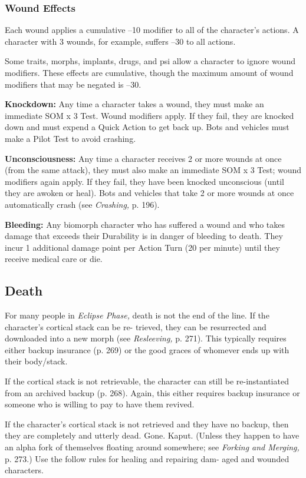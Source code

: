 \subsubsection{Wound Effects}

Each wound applies a cumulative –10 modifier to all 
of the character's actions. A character with 3 wounds, 
for example, suffers –30 to all actions.

Some traits, morphs, implants, drugs, and psi allow 
a character to ignore wound modifiers. These effects 
are cumulative, though the maximum amount of 
wound modifiers that may be negated is –30.

\textbf{Knockdown:} Any time a character takes a wound, 
they must make an immediate SOM x 3 Test. Wound 
modifiers apply. If they fail, they are knocked down 
and must expend a Quick Action to get back up. Bots 
and vehicles must make a Pilot Test to avoid crashing.

\textbf{Unconsciousness:} Any time a character receives 2 
or more wounds at once (from the same attack), they 
must also make an immediate SOM x 3 Test; wound 
modifiers again apply. If they fail, they have been 
knocked unconscious (until they are awoken or heal). 
Bots and vehicles that take 2 or more wounds at once 
automatically crash (see \textit{Crashing,} p. 196).

\textbf{Bleeding:} Any biomorph character who has suffered 
a wound and who takes damage that exceeds their 
Durability is in danger of bleeding to death. They 
incur 1 additional damage point per Action Turn (20 
per minute) until they receive medical care or die.

\subsection{Death}

For many people in \textit{Eclipse Phase,} death is not the end 
of the line. If the character's cortical stack can be re-
trieved, they can be resurrected and downloaded into 
a new morph (see \textit{Resleeving,} p. 271). This typically 
requires either backup insurance (p. 269) or the good 
graces of whomever ends up with their body/stack.

If the cortical stack is not retrievable, the character can 
still be re-instantiated from an archived backup (p. 268). 
Again, this either requires backup insurance or someone 
who is willing to pay to have them revived.

If the character's cortical stack is not retrieved 
and they have no backup, then they are completely 
and utterly dead. Gone. Kaput. (Unless they happen 
to have an alpha fork of themselves floating around 
somewhere; see \textit{Forking and Merging,} p. 273.)
Use the follow rules for healing and repairing dam-
aged and wounded characters.

